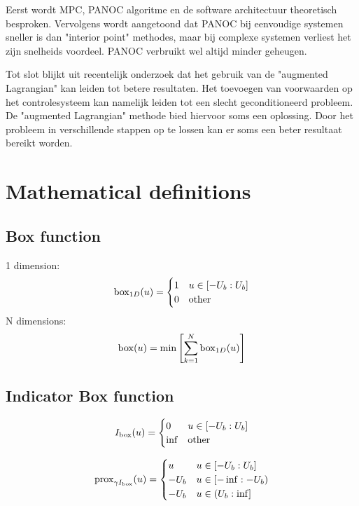 Eerst wordt MPC, PANOC algoritme en de software architectuur theoretisch besproken. Vervolgens wordt aangetoond dat PANOC bij eenvoudige systemen sneller is dan "interior point" methodes, maar bij complexe systemen verliest het zijn snelheids voordeel. PANOC verbruikt wel altijd minder geheugen.

Tot slot blijkt uit recentelijk onderzoek dat het gebruik van de "augmented Lagrangian" kan leiden tot betere resultaten. Het toevoegen van voorwaarden op het controlesysteem kan namelijk leiden tot een slecht geconditioneerd probleem. De "augmented Lagrangian" methode bied hiervoor soms een oplossing. Door het probleem in verschillende stappen op te lossen kan er soms een beter resultaat bereikt worden.

\chapter{Mathematical definitions}
	\section{Box function}
	\label{appendix:box function}
		1 dimension:
		\begin{equation}
			\operatorname{box}_{1D}(u) =
			\begin{cases}
				 1 & u \in [-U_b:U_b]\\
				 0 & \operatorname{other}
			\end{cases}
			\label{eq:box function 1 dimension}
		\end{equation}
		N dimensions:
		\begin{equation}
			\operatorname{box}(u) = \min\left[ \sum_{k=1}^ N \operatorname{box}_{1D}(u) \right]
			\label{eq:box function N dimensions}
		\end{equation}
	\section{Indicator Box function}
	\label{appendix:indicator box function}
		\begin{equation}
			I_{\operatorname{box}}(u)=
			\begin{cases}
				0 & u \in [-U_b:U_b]\\
				\inf & \operatorname{other}
			\end{cases}
		\end{equation}
		
		\begin{equation}
			\operatorname{prox}_{\gamma I_{\operatorname{box}}}(u)=
			\begin{cases}
				u & u \in [-U_b:U_b]\\
				-U_b & u \in [-\inf:-U_b)\\
				-U_b & u \in (U_b:\inf]\\
			\end{cases}
		\end{equation}
